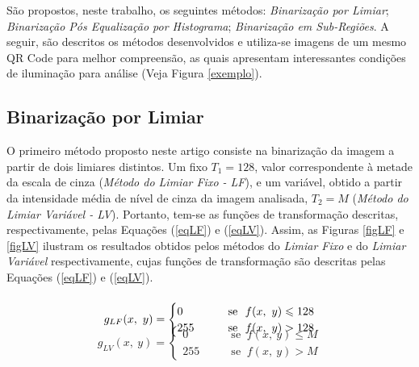 \documentclass{ceel}
\begin{document}
\begin{multicols}{2}
São propostos, neste trabalho, os seguintes métodos: \emph{Binarização por Limiar}; \emph{Binarização Pós Equalização por Histograma}; \emph{Binarização em Sub-Regiões}. A seguir, são descritos os métodos desenvolvidos e utiliza-se imagens de um mesmo QR Code para melhor compreensão, as quais apresentam interessantes condições de iluminação para análise (Veja Figura \ref{exemplo}).


\subsection{Binarização por Limiar} \label{Aconst}
O primeiro método proposto neste artigo consiste na binarização da imagem a partir de dois limiares distintos. Um fixo $T_1=128$, valor correspondente à metade da escala de cinza (\textit{Método do Limiar Fixo - LF}), e um variável, obtido a partir da intensidade média de nível de cinza da imagem analisada, $T_2=M$  (\textit{Método do Limiar Variável - LV}). Portanto, tem-se as funções de transformação descritas, respectivamente, pelas Equações (\ref{eqLF}) e (\ref{eqLV}). Assim, as Figuras \ref{figLF} e \ref{figLV} ilustram os resultados obtidos pelos métodos do \emph{Limiar Fixo} e do \emph{Limiar Variável} respectivamente, cujas funções de transformação são descritas pelas Equações (\ref{eqLF}) e (\ref{eqLV}).


\begin{gather}
\vspace{-1cm}
g_{LF}( x,\ y) =\begin{cases}
0 & \quad \quad \text{se }\ f( x,\ y) \leqslant 128\\
255 & \quad \quad \text{se }\ f( x,\ y)  >128
\end{cases}
\label{eqLF}
\end{gather}

\begin{gather}
g_{LV}( x,\ y) =\begin{cases}
0 & \quad \quad \text{se }\ f( x,\ y) \leqslant M\\
255 & \quad \quad \text{se }\ f( x,\ y)  >M
\end{cases}
\label{eqLV}
\end{gather}

\end{multicols}
\end{document}
